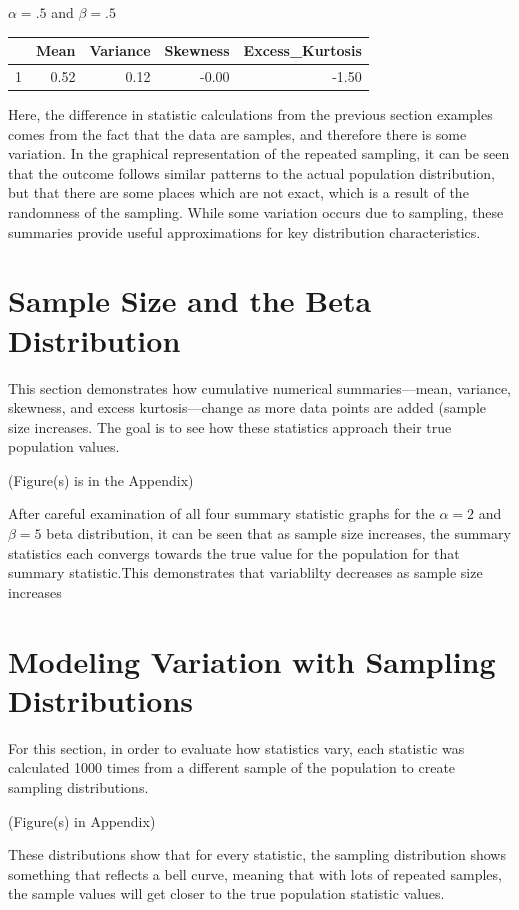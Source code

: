 \documentclass{article}\usepackage[]{graphicx}\usepackage[]{xcolor}
\begin{document}
\begin{multicols}{2}
$\alpha = .5$ and $\beta = .5$
\begin{table}[H]
\centering
\begin{tabular}{rrrrr}
  \hline
 & Mean & Variance & Skewness & Excess\_Kurtosis \\ 
  \hline
1 & 0.52 & 0.12 & -0.00 & -1.50 \\ 
   \hline
\end{tabular}
\end{table}

Here, the difference in statistic calculations from the previous section examples comes from the fact that the data are samples, and therefore there is some variation. In the graphical representation of the repeated sampling, it can be seen that the outcome follows similar patterns to the actual population distribution, but that there are some places which are not exact, which is a result of the randomness of the sampling. While some variation occurs due to sampling, these summaries provide useful approximations for key distribution characteristics.

\section{Sample Size and the Beta Distribution}
This section demonstrates how cumulative numerical summaries—mean, variance, skewness, and excess kurtosis—change as more data points are added (sample size increases. The goal is to see how these statistics approach their true population values.

(Figure(s) is in the Appendix)

After careful examination of all four summary statistic graphs for the $\alpha=2$ and $\beta=5$ beta distribution, it can be seen that as sample size increases, the summary statistics each convergs towards the true value for the population for that summary statistic.This demonstrates that variablilty decreases as sample size increases

\section{Modeling Variation with Sampling Distributions}
For this section, in order to evaluate how statistics vary, each statistic was calculated 1000 times from a different sample of the population to create sampling distributions.  

(Figure(s) in Appendix)

These distributions show that for every statistic, the sampling distribution shows something that reflects a bell curve, meaning that with lots of repeated samples, the sample values will get closer to the true population statistic values.



\end{multicols}
\end{document}
